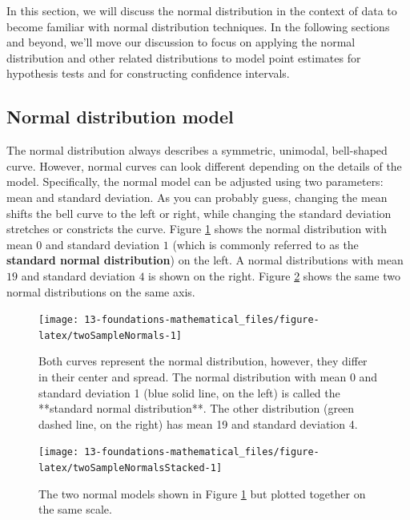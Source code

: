 \documentclass[
  10pt,
  openany]{book}
\begin{document}
In this section, we will discuss the normal distribution in the context of data to become familiar with normal distribution techniques.
In the following sections and beyond, we'll move our discussion to focus on applying the normal distribution and other related distributions to model point estimates for hypothesis tests and for constructing confidence intervals.

\hypertarget{normal-distribution-model}{%
\subsection{Normal distribution model}\label{normal-distribution-model}}

The normal distribution always describes a symmetric, unimodal, bell-shaped curve.
However, normal curves can look different depending on the details of the model.
Specifically, the normal model can be adjusted using two parameters: mean and standard deviation.
As you can probably guess, changing the mean shifts the bell curve to the left or right, while changing the standard deviation stretches or constricts the curve.
Figure \ref{fig:twoSampleNormals} shows the normal distribution with mean \(0\) and standard deviation \(1\) (which is commonly referred to as the \textbf{standard normal distribution}) on the left.
A normal distributions with mean \(19\) and standard deviation \(4\) is shown on the right.
Figure \ref{fig:twoSampleNormalsStacked} shows the same two normal distributions on the same axis.

\begin{figure}[h]

{\centering \texttt{[image: 13-foundations-mathematical\_files/figure-latex/twoSampleNormals-1]} 

}

\caption{Both curves represent the normal distribution, however, they differ in their center and spread. The normal distribution with mean 0 and standard deviation 1 (blue solid line, on the left) is called the **standard normal distribution**. The other distribution (green dashed line, on the right) has mean 19 and standard deviation 4.}\label{fig:twoSampleNormals}
\end{figure}

\begin{figure}[h]

{\centering \texttt{[image: 13-foundations-mathematical\_files/figure-latex/twoSampleNormalsStacked-1]} 

}

\caption{The two normal models shown in Figure \ref{fig:twoSampleNormals} but plotted together on the same scale.}\label{fig:twoSampleNormalsStacked}
\end{figure}
\end{document}

